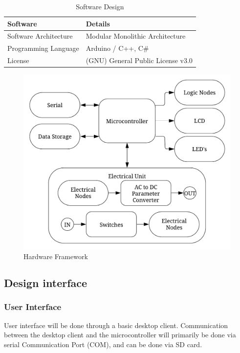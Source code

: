 \documentclass[conference, a4paper]{IEEEtran}
\begin{document}
\begin{table}[tbh]

  \centering
  \caption{Software Design}
  \label{tbl:software_design}
  \begin{tabular}{ll}

      \toprule
      \textbf{Software} & \textbf{Details}\\
      \midrule
      Software Architecture & Modular Monolithic Architecture  \\
      Programming Language & Arduino / C++, C\# \\
      License & (GNU) General Public License v3.0 \\

      \bottomrule
  \end{tabular}
\end{table}

\begin{figure}[tbh]
  \centering
  \includegraphics[width=\columnwidth]{img/hardware_framework.png}
  \caption{Hardware Framework}
  \label{fig:hardware_framework}
\end{figure}


\subsection{Design interface}
\subsubsection{User Interface}
User interface will be done through a basic desktop client. Communication between the desktop client and the microcontroller will primarily be done via serial Communication Port (COM), and can be done via SD card.
\end{document}
